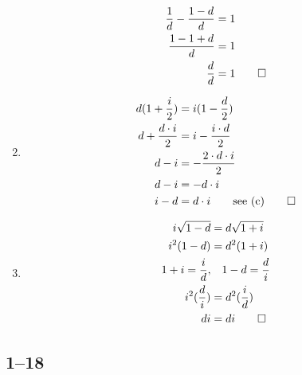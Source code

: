 \documentclass[a4paper, 12pt, reqno]{amsart}
\numberwithin{equation}{section}
\begin{document}
\begin{enumerate}[label=(\alph*)]
\begin{equation}
\begin{aligned}
                \frac{1}{d} - \frac{1-d}{d} &= 1   \\
                \frac{1-1+d}{d} &= 1   \\
                \frac{d}{d} &= 1   \qed
            \end{aligned}
        \end{equation}
    \item \begin{equation}\nonumber
            \begin{aligned}
                d(1 + \frac{i}{2}) &= i(1-\frac{d}{2})      \\
                d + \frac{d \cdot i}{2} &= i -\frac{i \cdot d}{2}      \\
                d - i &= -\frac{2 \cdot d \cdot i}{2} \\
                d - i &= -d \cdot i \\
                i - d &= d \cdot i \qquad \text{see (c)} \qed
            \end{aligned}
        \end{equation}
    \item \begin{equation}\nonumber
            \begin{aligned}
                i\sqrt{1-d} &= d\sqrt{1+i}      \\
                i^2(1-d) &= d^2(1+i)            \\
                1+i = \frac{i}{d}, &\quad 1-d = \frac{d}{i}   \\
                i^2(\frac{d}{i}) &= d^2(\frac{i}{d})     \\
                di &= di        \qed
            \end{aligned}
        \end{equation}
\end{enumerate}

\subsection*{1--18}
\end{document}
